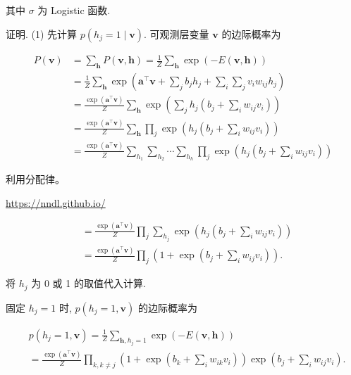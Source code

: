 \documentclass[10pt]{article}
\begin{document}
其中 $\sigma$ 为 Logistic 函数.

证明. (1) 先计算 $p\left(h_{j}=1 \mid \boldsymbol{v}\right)$. 可观测层变量 $\boldsymbol{v}$ 的边际概率为


\begin{align*}
P(\boldsymbol{v}) & =\sum_{\boldsymbol{h}} P(\boldsymbol{v}, \boldsymbol{h})=\frac{1}{Z} \sum_{\boldsymbol{h}} \exp (-E(\boldsymbol{v}, \boldsymbol{h}))  \tag{12.35}\\
& =\frac{1}{Z} \sum_{\boldsymbol{h}} \exp \left(\boldsymbol{a}^{\top} \boldsymbol{v}+\sum_{j} b_{j} h_{j}+\sum_{i} \sum_{j} v_{i} w_{i j} h_{j}\right)  \tag{12.36}\\
& =\frac{\exp \left(\boldsymbol{a}^{\top} \boldsymbol{v}\right)}{Z} \sum_{\boldsymbol{h}} \exp \left(\sum_{j} h_{j}\left(b_{j}+\sum_{i} w_{i j} v_{i}\right)\right)  \tag{12.37}\\
& =\frac{\exp \left(\boldsymbol{a}^{\top} \boldsymbol{v}\right)}{Z} \sum_{\boldsymbol{h}} \prod_{j} \exp \left(h_{j}\left(b_{j}+\sum_{i} w_{i j} v_{i}\right)\right)  \tag{12.38}\\
& =\frac{\exp \left(\boldsymbol{a}^{\top} \boldsymbol{v}\right)}{Z} \sum_{h_{1}} \sum_{h_{2}} \cdots \sum_{h_{h}} \prod_{j} \exp \left(h_{j}\left(b_{j}+\sum_{i} w_{i j} v_{i}\right)\right) \tag{12.39}
\end{align*}


利用分配律。

\href{https://nndl.github.io/}{https://nndl.github.io/}


\begin{align*}
& =\frac{\exp \left(\boldsymbol{a}^{\top} \boldsymbol{v}\right)}{Z} \prod_{j} \sum_{h_{j}} \exp \left(h_{j}\left(b_{j}+\sum_{i} w_{i j} v_{i}\right)\right)  \tag{12.40}\\
& =\frac{\exp \left(\boldsymbol{a}^{\top} \boldsymbol{v}\right)}{Z} \prod_{j}\left(1+\exp \left(b_{j}+\sum_{i} w_{i j} v_{i}\right)\right) . \tag{12.41}
\end{align*}


将 $h_{j}$ 为 0 或 1 的取值代入计算.

固定 $h_{j}=1$ 时, $p\left(h_{j}=1, \boldsymbol{v}\right)$ 的边际概率为


\begin{align*}
& p\left(h_{j}=1, \boldsymbol{v}\right)=\frac{1}{Z} \sum_{\boldsymbol{h}, h_{j}=1} \exp (-E(\boldsymbol{v}, \boldsymbol{h}))  \tag{12.42}\\
& =\frac{\exp \left(\boldsymbol{a}^{\top} \boldsymbol{v}\right)}{Z} \prod_{k, k \neq j}\left(1+\exp \left(b_{k}+\sum_{i} w_{i k} v_{i}\right)\right) \exp \left(b_{j}+\sum_{i} w_{i j} v_{i}\right) . \tag{12.43}
\end{align*}
\end{document}
